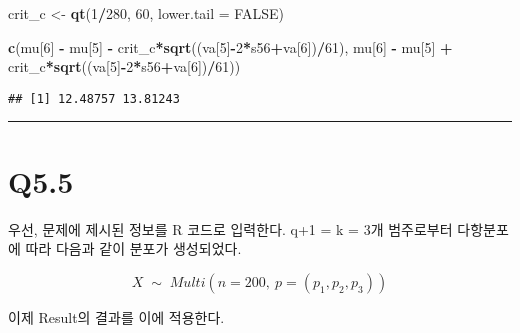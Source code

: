 \documentclass[
]{article}
\newenvironment{Shaded}{\begin{snugshade}}{\end{snugshade}}
\newcommand{\AttributeTok}[1]{\textcolor[rgb]{0.13,0.29,0.53}{#1}}
\newcommand{\ConstantTok}[1]{\textcolor[rgb]{0.56,0.35,0.01}{#1}}
\newcommand{\DecValTok}[1]{\textcolor[rgb]{0.00,0.00,0.81}{#1}}
\newcommand{\FunctionTok}[1]{\textcolor[rgb]{0.13,0.29,0.53}{\textbf{#1}}}
\newcommand{\NormalTok}[1]{#1}
\newcommand{\OtherTok}[1]{\textcolor[rgb]{0.56,0.35,0.01}{#1}}
\newcommand{\SpecialCharTok}[1]{\textcolor[rgb]{0.81,0.36,0.00}{\textbf{#1}}}
\begin{document}
\begin{Shaded}
\begin{Highlighting}[]
\NormalTok{crit\_c }\OtherTok{\textless{}{-}} \FunctionTok{qt}\NormalTok{(}\DecValTok{1}\SpecialCharTok{/}\DecValTok{280}\NormalTok{, }\DecValTok{60}\NormalTok{, }\AttributeTok{lower.tail =} \ConstantTok{FALSE}\NormalTok{)}

\FunctionTok{c}\NormalTok{(mu[}\DecValTok{6}\NormalTok{] }\SpecialCharTok{{-}}\NormalTok{ mu[}\DecValTok{5}\NormalTok{] }\SpecialCharTok{{-}}\NormalTok{ crit\_c}\SpecialCharTok{*}\FunctionTok{sqrt}\NormalTok{((va[}\DecValTok{5}\NormalTok{]}\SpecialCharTok{{-}}\DecValTok{2}\SpecialCharTok{*}\NormalTok{s56}\SpecialCharTok{+}\NormalTok{va[}\DecValTok{6}\NormalTok{])}\SpecialCharTok{/}\DecValTok{61}\NormalTok{), }
\NormalTok{  mu[}\DecValTok{6}\NormalTok{] }\SpecialCharTok{{-}}\NormalTok{ mu[}\DecValTok{5}\NormalTok{] }\SpecialCharTok{+}\NormalTok{ crit\_c}\SpecialCharTok{*}\FunctionTok{sqrt}\NormalTok{((va[}\DecValTok{5}\NormalTok{]}\SpecialCharTok{{-}}\DecValTok{2}\SpecialCharTok{*}\NormalTok{s56}\SpecialCharTok{+}\NormalTok{va[}\DecValTok{6}\NormalTok{])}\SpecialCharTok{/}\DecValTok{61}\NormalTok{))}
\end{Highlighting}
\end{Shaded}

\begin{verbatim}
## [1] 12.48757 13.81243
\end{verbatim}

\begin{center}\rule{0.5\linewidth}{0.5pt}\end{center}

\section{Q5.5}\label{q5.5}

우선, 문제에 제시된 정보를 R 코드로 입력한다. q+1 = k = 3개 범주로부터
다항분포에 따라 다음과 같이 분포가 생성되었다.

\[
X \; {\sim} \; Multi(n = 200, ~ p = (p_1, p_2, p_3))
\]

이제 Result의 결과를 이에 적용한다.
\end{document}
